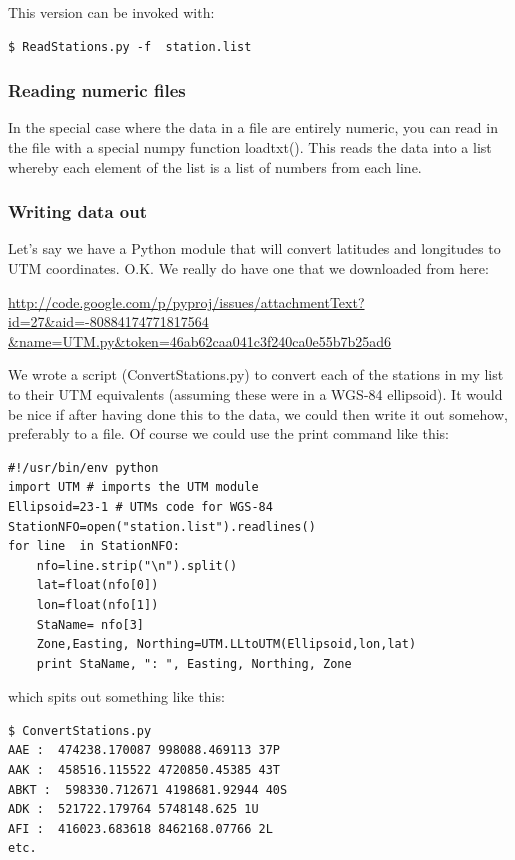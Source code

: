 \documentclass[11pt]{book}
\begin{document}
{{{{\noindent This version can be invoked with:

{\color{blue}\begin{verbatim}
$ ReadStations.py -f  station.list
\end{verbatim}}

\subsubsection{Reading numeric files}

In the special case where the data in a file are entirely numeric, you can read in the file with a special {\color{blue}numpy} function {\color{blue}loadtxt()}.  This reads the data into a list whereby each element of the list is a list of numbers from each line.

 \subsubsection{Writing data out}

Let's say we  have a Python module that will convert latitudes and longitudes to UTM coordinates.  O.K. We really do have one that we downloaded from here:

\url{http://code.google.com/p/pyproj/issues/attachmentText?id=27\&aid=-80884174771817564 \&name=UTM.py\&token=46ab62caa041c3f240ca0e55b7b25ad6}

\noindent We wrote a script ({\color{blue}ConvertStations.py}) to convert each of the stations in my list to their UTM equivalents (assuming these were in a WGS-84 ellipsoid).  It would be nice if  after having done this to the data, we could then write it out somehow, preferably to a file.  Of course we could use the {\color{blue}print} command like this:


 { \color{blue} \begin{verbatim}
#!/usr/bin/env python
import UTM # imports the UTM module
Ellipsoid=23-1 # UTMs code for WGS-84
StationNFO=open("station.list").readlines()
for line  in StationNFO:
    nfo=line.strip("\n").split()
    lat=float(nfo[0])
    lon=float(nfo[1])
    StaName= nfo[3]
    Zone,Easting, Northing=UTM.LLtoUTM(Ellipsoid,lon,lat)
    print StaName, ": ", Easting, Northing, Zone
 \end{verbatim}}

\noindent
which spits out something like this:

{ \color{blue} \begin{verbatim}
$ ConvertStations.py
AAE :  474238.170087 998088.469113 37P
AAK :  458516.115522 4720850.45385 43T
ABKT :  598330.712671 4198681.92944 40S
ADK :  521722.179764 5748148.625 1U
AFI :  416023.683618 8462168.07766 2L
etc.
\end{verbatim}}

}}}}
\end{document}
